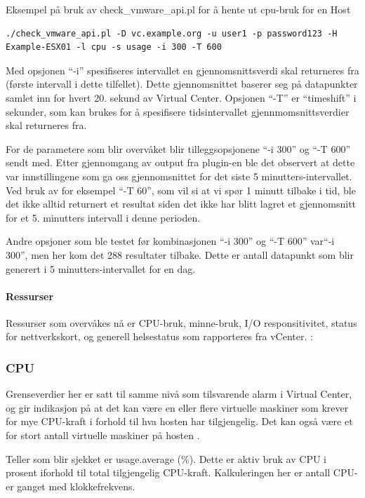 Eksempel på bruk av check\_vmware\_api.pl for å hente ut cpu-bruk for en Host
\begin{lstlisting}[style=example]
./check_vmware_api.pl -D vc.example.org -u user1 -p password123 -H Example-ESX01 -l cpu -s usage -i 300 -T 600
\end{lstlisting}

Med opsjonen ``-i'' spesifiseres intervallet en gjennomsnittsverdi skal returneres fra (første intervall i dette tilfellet). Dette gjennomsnittet baserer seg på datapunkter samlet inn for hvert 20. sekund av Virtual Center. Opsjonen ``-T''  er ``timeshift'' i sekunder, som kan brukes for å spesifisere tidsintervallet gjennmomsnittsverdier skal returneres fra. 

For de parametere som blir overvåket blir tilleggsopsjonene ``-i 300'' og ``-T 600'' sendt med. Etter gjennomgang av output fra plugin-en ble det observert at dette var innstillingene som ga oss gjennomsnittet for det siste 5 minutters-intervallet. Ved bruk av for eksempel ``-T 60'', som vil si at vi spør 1 minutt tilbake i tid, ble det ikke alltid returnert et resultat siden det ikke har blitt lagret et gjennomsnitt for et 5. minutters intervall i denne perioden. 

Andre opsjoner som ble testet før kombinasjonen ``-i 300'' og ``-T 600'' var``-i 300'', men her kom det 288 resultater tilbake. Dette er antall datapunkt som blir generert i 5 minutters-intervallet for en dag. \cite{vmwareperfintervals}

\paragraph{Ressurser}
Ressurser som overvåkes nå er CPU-bruk, minne-bruk, I/O responsitivitet, status for nettverkskort, og generell helsestatus som rapporteres fra vCenter.\cite{ciscovirtual} \cite{vmwaremonitoring}:

\subsubsection*{CPU}
Grenseverdier her er satt til samme nivå som tilsvarende alarm i Virtual Center, og gir indikasjon på at det kan være en eller flere virtuelle maskiner som krever for mye CPU-kraft i forhold til hva hosten har tilgjengelig. Det kan også være et for stort antall virtuelle maskiner på hosten \cite{vmwarecounters}.

Teller som blir sjekket er usage.average (\%). Dette er aktiv bruk av CPU i prosent iforhold til total tilgjengelig CPU-kraft. Kalkuleringen her er antall CPU-er ganget med klokkefrekvens.

